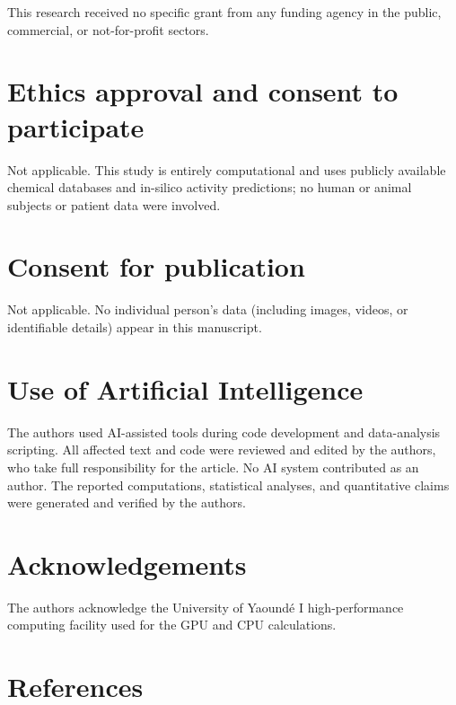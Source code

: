 \documentclass[11pt,a4paper]{article}
\begin{document}
This research received no specific grant from any funding agency in the public, commercial, or not-for-profit sectors.

\section{Ethics approval and consent to participate}

Not applicable. This study is entirely computational and uses publicly available chemical databases and in-silico activity predictions; no human or animal subjects or patient data were involved.

\section{Consent for publication}

Not applicable. No individual person's data (including images, videos, or identifiable details) appear in this manuscript.

\section{Use of Artificial Intelligence}

The authors used AI-assisted tools during code development and data-analysis scripting. All affected text and code were reviewed and edited by the authors, who take full responsibility for the article. No AI system contributed as an author. The reported computations, statistical analyses, and quantitative claims were generated and verified by the authors.

\section{Acknowledgements}

The authors acknowledge the University of Yaoundé I high-performance computing facility used for the GPU and CPU calculations.

\section*{References}


\end{document}
